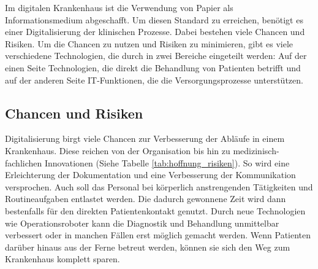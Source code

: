 Im digitalen Krankenhaus ist die Verwendung von Papier als Informationsmedium abgeschafft. Um diesen Standard zu erreichen, benötigt es einer Digitalisierung der klinischen Prozesse. Dabei bestehen viele Chancen und Risiken. Um die Chancen zu nutzen und Risiken zu minimieren, gibt es viele verschiedene Technologien, die durch \cite{braeutigam2017} in zwei Bereiche eingeteilt werden: Auf der einen Seite Technologien, die direkt die Behandlung von Patienten betrifft und auf der anderen Seite IT-Funktionen, die die Versorgungsprozesse unterstützen.
\subsection{Chancen und Risiken}
Digitalisierung birgt viele Chancen zur Verbesserung der Abläufe in einem Krankenhaus. Diese reichen von der Organisation bis hin zu medizinisch-fachlichen Innovationen (Siehe Tabelle \ref{tab:hoffnung_risiken}). So wird eine Erleichterung der Dokumentation und eine Verbesserung der Kommunikation versprochen. Auch soll das Personal bei körperlich anstrengenden Tätigkeiten und Routineaufgaben entlastet werden. Die dadurch gewonnene Zeit wird dann bestenfalls für den direkten Patientenkontakt genutzt. Durch neue Technologien wie Operationsroboter kann die Diagnostik und Behandlung unmittelbar verbessert oder in manchen Fällen erst möglich gemacht werden. Wenn Patienten darüber hinaus aus der Ferne betreut werden, können sie sich den Weg zum Krankenhaus komplett sparen. \parencite{braeutigam2017}

